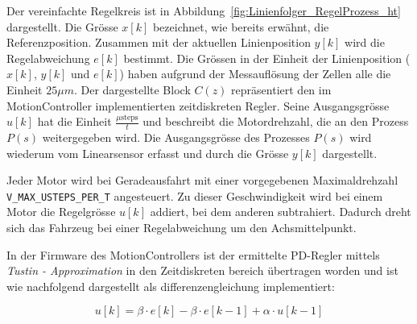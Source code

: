 \documentclass[main.tex]{subfiles} %
\begin{document}
Der vereinfachte Regelkreis ist in
Abbildung~\ref{fig:Linienfolger_RegelProzess_ht} dargestellt. Die Grösse $x[k]$
bezeichnet, wie bereits erwähnt, die Referenzposition. Zusammen mit der
aktuellen Linienposition $y[k]$ wird die Regelabweichung $e[k]$ bestimmt. Die
Grössen in der Einheit der Linienposition ($x[k]$, $y[k]$ und $e[k]$) haben
aufgrund der Messauflösung der Zellen alle die Einheit $25 \mu m$. Der
dargestellte Block $C(z)$ repräsentiert den im MotionController implementierten
zeitdiskreten Regler. Seine Ausgangsgrösse $u[k]$ hat die Einheit $\frac{\mu
        \text{steps}}{t}$ und beschreibt die Motordrehzahl, die an den Prozess $P(s)$
weitergegeben wird. Die Ausgangsgrösse des Prozesses $P(s)$ wird wiederum vom
Linearsensor erfasst und durch die Grösse $y[k]$ dargestellt.

Jeder Motor wird bei Geradeausfahrt mit einer vorgegebenen Maximaldrehzahl
\texttt{V\_MAX\_USTEPS\_PER\_T} angesteuert. Zu dieser Geschwindigkeit wird bei
einem Motor die Regelgrösse $u[k]$ addiert, bei dem anderen subtrahiert.
Dadurch dreht sich das Fahrzeug bei einer Regelabweichung um den
Achsmittelpunkt.

In der Firmware des MotionControllers ist der ermittelte PD-Regler mittels
\textit{Tustin - Approximation} in den Zeitdiskreten bereich übertragen worden
und ist wie nachfolgend dargestellt als differenzengleichung implementiert:

\[
    u[k] = \beta \cdot e[k] - \beta \cdot e[k - 1] + \alpha \cdot u[k - 1]
\]
\end{document}

